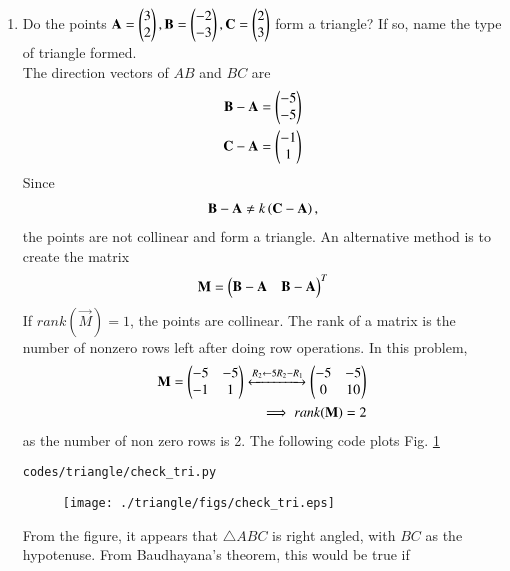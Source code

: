 \begin{enumerate}[label=\arabic*.,ref=\thesubsection.\theenumi]
%
\item Do the points $\mathbf{A}=\begin{pmatrix}3\\2\end{pmatrix}, \mathbf{B}=\begin{pmatrix}-2\\-3\end{pmatrix}, \mathbf{C}=\begin{pmatrix}2\\3\end{pmatrix} $ form a triangle?  If so, name the type of triangle formed.
\label{prob:tri_exam_coll_pts}
%
\\
\solution The direction vectors of $AB$ and $BC$ are 
\begin{align}
\label{eq:tri_geo_ex_baorth}
\mathbf{B}-\mathbf{A} &= \begin{pmatrix}-5\\-5\end{pmatrix}
\\
\mathbf{C}-\mathbf{A} &= \begin{pmatrix}-1\\1\end{pmatrix}
\label{eq:tri_geo_ex_caorth}
\end{align}
%
Since 
%
\begin{align}
\mathbf{B}-\mathbf{A} \ne k\left(\mathbf{C}-\mathbf{A}\right),
\end{align}
%
the points are not collinear and form a triangle.  An alternative method is to create the matrix
\begin{align}
\label{eq:tri_geo_ex_diff_mat}
\mathbf{M} = \begin{pmatrix}\mathbf{B}-\mathbf{A} & \mathbf{B}-\mathbf{A}\end{pmatrix}^T 
\end{align}
%
If $rank(\vec{M}) = 1$, the points are collinear.  The rank of a matrix is the number of nonzero rows left after doing row operations.  In this problem, 
%
\begin{align}
\mathbf{M} = \begin{pmatrix}-5 & -5\\-1 & 1\end{pmatrix}\xleftrightarrow {R_2\leftarrow 5R_2-R_1}\begin{pmatrix}-5 & -5\\0 & 10\end{pmatrix}
\\
\implies rank(\mathbf{M}) = 2
\end{align}
%
as the number of non zero rows is 2.
The following code plots Fig. \ref{fig:check_tri}
%
\begin{lstlisting}
codes/triangle/check_tri.py
\end{lstlisting}
%
\begin{figure}[!ht]
\texttt{[image: ./triangle/figs/check\_tri.eps]}
\caption{}
\label{fig:check_tri}
\end{figure}
%
From the figure, it appears that $\triangle ABC$ is right angled, with $BC$ as the hypotenuse.  From Baudhayana's theorem, this would be true if 

\end{enumerate}
